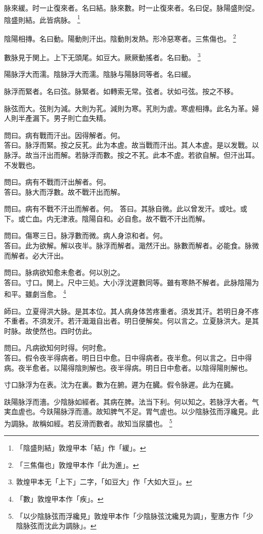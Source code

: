 \documentclass[b5paper,twoside,zihao=-4,UTF8]{ctexbook}
\begin{document}
脉來緩。时一止復來者。名曰結。脉來數。时一止復來者。名曰促。脉陽盛則促。陰盛則結。此皆病脉。
	\footnote{「陰盛則結」敦煌甲本「結」作「緩」。}

陰陽相摶。名曰動。陽動則汗出。陰動則发熱。形冷惡寒者。三焦傷也。
	\footnote{「三焦傷也」敦煌甲本作「此为進」。}

數脉見于関上。{上下}无頭尾。如豆大。厥厥動搖者。名曰動。
	\footnote{敦煌甲本无「上下」二字，「如豆大」作「大如大豆」。}

陽脉浮大而濡。陰脉浮大而濡。陰脉与陽脉同等者。名曰緩。

脉浮而緊者。名曰弦。脉緊者。如轉索无常。弦者。状如弓弦。按之不移。

脉弦而大。弦則为減。大則为芤。減則为寒。芤則为虗。寒虗相摶。此名为革。婦人則半產漏下。男子則亡血失精。

問曰。病有戰而汗出。因得解者。何。\\
答曰。脉浮而緊。按之反芤。此为本虗。故当戰而汗出。其人本虗。是以发戰。以脉浮。故当汗出而解。若脉浮而數。按之不芤。此本不虗。若欲自解。但汗出耳。不发戰也。

問曰。病有不戰而汗出解者。何。\\
答曰。脉大而浮數。故不戰汗出而解。

問曰。病有不戰不汗出而解者。何。
答曰。其脉自微。此以曾发汗。或吐。或下。或亡血。内无津液。陰陽自和。必自愈。故不戰不汗出而解。

問曰。傷寒三日。脉浮數而微。病人身涼和者。何。\\
答曰。此为欲解。解以夜半。脉浮而解者。濈然汗出。脉數而解者。必能食。脉微而解者。必大汗出。

問曰。脉病欲知愈未愈者。何以別之。\\
答曰。寸口。関上。尺中三処。大小浮沈遲數同等。雖有寒熱不解者。此脉陰陽为和平。雖劇当愈。
	\footnote{「數」敦煌甲本作「疾」。}

師曰。立夏得洪大脉。是其本位。其人病身体苦疼重者。須发其汗。若明日身不疼不重者。不須发汗。若汗濈濈自出者。明日便解矣。何以言之。立夏脉洪大。是其时脉。故使然也。四时仿此。

問曰。凡病欲知何时得。何时愈。\\
答曰。假令夜半得病者。明日日中愈。日中得病者。夜半愈。何以言之。日中得病。夜半愈者。以陽得陰則解也。夜半得病。明日日中愈者。以陰得陽則解也。

寸口脉浮为在表。沈为在裏。數为在腑。遲为在臓。假令脉遲。此为在臓。

趺陽脉浮而濇。少陰脉如經者。其病在脾。法当下利。何以知之。若脉浮大者。气実血虗也。今趺陽脉浮而濇。故知脾气不足。胃气虗也。以少陰脉弦而浮纔見。此为調脉。故稱如經。若反滑而數者。故知当尿膿也。
	\footnote{「以少陰脉弦而浮纔見」敦煌甲本作「少陰脉弦沈纔見为調」，聖惠方作「少陰脉弦而沈此为調脉」。}
\end{document}

